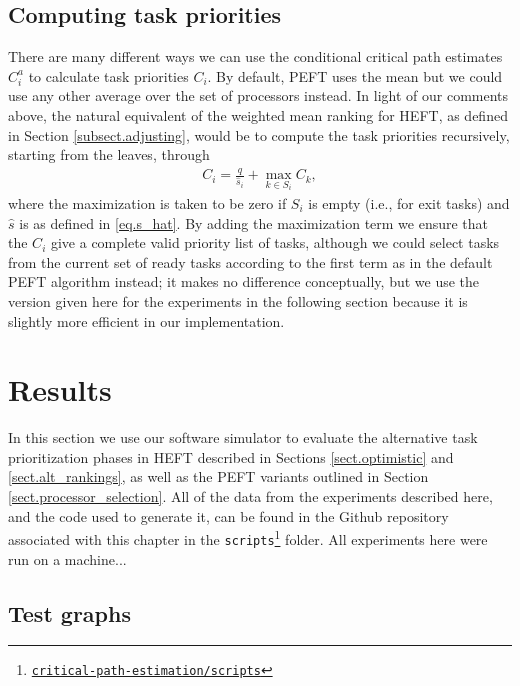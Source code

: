 \documentclass[12pt]{article}
\begin{document}
\subsection{Computing task priorities}
\label{subsect.ps_priorities}

There are many different ways we can use the conditional critical path estimates $C_i^a$ to calculate task priorities $C_i$. By default, PEFT uses the mean but we could use any other average over the set of processors instead. In light of our comments above, the natural equivalent of the weighted mean ranking for HEFT, as defined in Section \ref{subsect.adjusting}, would be to compute the task priorities recursively, starting from the leaves, through 
\begin{align}
C_i = \frac{q}{\hat{s}_i} + \max_{k \in S_i} C_k, \label{eq.alt_prios}
\end{align}  
where the maximization is taken to be zero if $S_i$ is empty (i.e., for exit tasks) and $\hat{s}$ is as defined in \eqref{eq.s_hat}. By adding the maximization term we ensure that the $C_i$ give a complete valid priority list of tasks, although we could select tasks from the current set of ready tasks according to the first term as in the default PEFT algorithm instead; it makes no difference conceptually, but we use the version given here for the experiments in the following section because it is slightly more efficient in our implementation.

\section{Results}
\label{sect.results}

In this section we use our software simulator to evaluate the alternative task prioritization phases in HEFT described in Sections \ref{sect.optimistic} and \ref{sect.alt_rankings}, as well as the PEFT variants outlined in Section \ref{sect.processor_selection}. All of the data from the experiments described here, and the code used to generate it, can be found in the Github repository associated with this chapter in the {\tt scripts}\footnote{\href{https://github.com/mcsweeney90/critical-path-estimation}{{\tt \small critical-path-estimation/scripts}}} folder. All experiments here were run on a machine...

\subsection{Test graphs}
\label{subsect.graphs}
\end{document}
